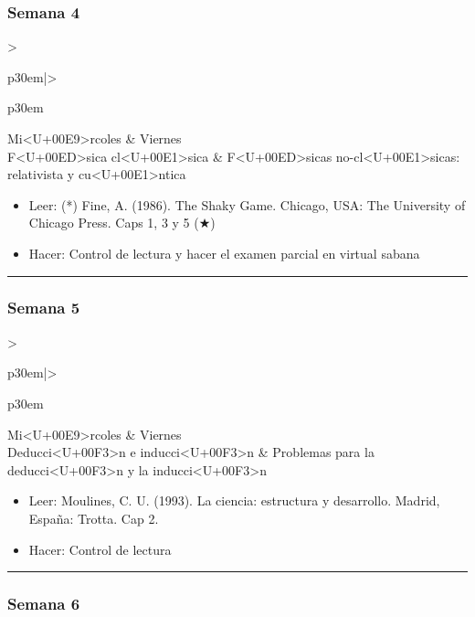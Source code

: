 \documentclass[spanish,]{article}
\begin{document}
\subsubsection{Semana 4}\label{semana-4}

\begin{tabular}{>{\raggedright\arraybackslash}p{30em}|>{\raggedright\arraybackslash}p{30em}}
\hline
Mi<U+00E9>rcoles & Viernes\\
\hline
F<U+00ED>sica cl<U+00E1>sica & F<U+00ED>sicas no-cl<U+00E1>sicas: relativista y cu<U+00E1>ntica\\
\hline
\end{tabular}

\begin{itemize}
\item
  Leer: (*) Fine, A. (1986). The Shaky Game. Chicago, USA: The
  University of Chicago Press. Caps 1, 3 y 5 (★)
\item
  Hacer: Control de lectura y hacer el examen parcial en virtual sabana
\end{itemize}

\begin{center}\rule{0.5\linewidth}{\linethickness}\end{center}

\subsubsection{Semana 5}\label{semana-5}

\begin{tabular}{>{\raggedright\arraybackslash}p{30em}|>{\raggedright\arraybackslash}p{30em}}
\hline
Mi<U+00E9>rcoles & Viernes\\
\hline
Deducci<U+00F3>n e inducci<U+00F3>n & Problemas para la deducci<U+00F3>n y la inducci<U+00F3>n\\
\hline
\end{tabular}

\begin{itemize}
\item
  Leer: Moulines, C. U. (1993). La ciencia: estructura y desarrollo.
  Madrid, España: Trotta. Cap 2.
\item
  Hacer: Control de lectura
\end{itemize}

\begin{center}\rule{0.5\linewidth}{\linethickness}\end{center}

\subsubsection{Semana 6}\label{semana-6}
\end{document}
